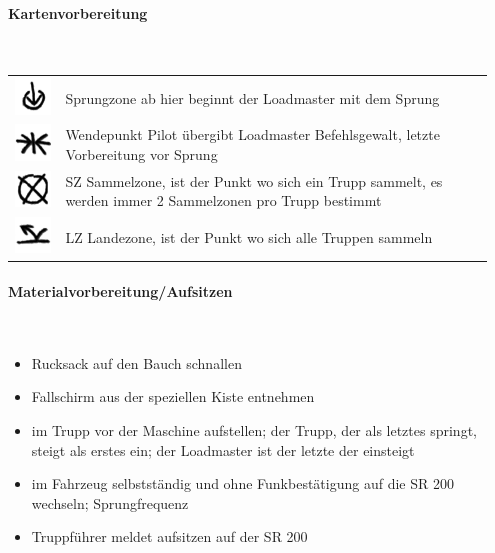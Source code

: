 \paragraph{Kartenvorbereitung} \hfil\\
\begin{tabular}{C{0.1\linewidth} m{0.85\linewidth}}
	\includegraphics[scale=0.8]{./img/fortgeschrittenes/fallschirmspringen/Endpunkt.png}	&	Sprungzone ab hier beginnt der Loadmaster mit dem Sprung\\
	\includegraphics[scale=0.8]{./img/fortgeschrittenes/fallschirmspringen/Treffpunkt.png} 	&	Wendepunkt Pilot übergibt Loadmaster Befehlsgewalt, letzte Vorbereitung vor Sprung\\
	\includegraphics[scale=0.8]{./img/fortgeschrittenes/fallschirmspringen/Aufgabe.png}	&	SZ Sammelzone, ist der Punkt wo sich ein Trupp sammelt, es werden immer 2 Sammelzonen pro Trupp bestimmt \\
	\includegraphics[scale=0.8]{./img/fortgeschrittenes/fallschirmspringen/LZ.png}	&	LZ Landezone, ist der Punkt wo sich alle Truppen sammeln
\end{tabular}

\paragraph{Materialvorbereitung/Aufsitzen} \hfil\\
	\begin{itemize}
		\item Rucksack auf den Bauch schnallen 
		\item  Fallschirm aus der speziellen Kiste entnehmen
		\item  im Trupp vor der Maschine aufstellen; der Trupp, der als letztes springt, steigt als erstes ein; der Loadmaster ist der letzte der einsteigt
		\item im Fahrzeug selbstständig und ohne Funkbestätigung auf die SR 200 wechseln; Sprungfrequenz
		\item  Truppführer meldet aufsitzen auf der SR 200
	\end{itemize}


